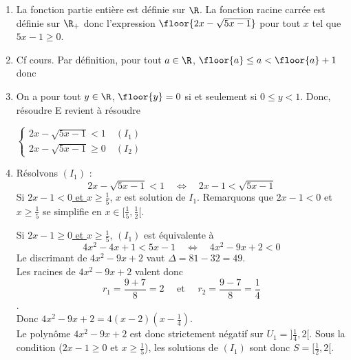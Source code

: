 \begin{correction}
\begin{enumerate}
\item La fonction partie entière est définie sur $\R$. La fonction racine carrée est définie sur $\R_+$ donc 
l'expression $\floor{2x - \sqrt{5x-1}} $ pour tout $x$ tel que $5x-1\geq0$. 
\begin{center}
\end{center} 

\item Cf cours. Par définition, pour tout $a\in \R$, $\floor{a}\leq a <\floor{a}+1$ donc 

\begin{center}
\end{center} 

\item On a pour tout $y\in \R$, $\floor{y}=0$ si et seulement si $0\leq y <1$. Donc, résoudre E revient à résoudre 


\begin{center}

$\boxed{ 
\left\{
\begin{array}{c}
2x-\sqrt{5x-1} <1 \quad (I_1)\\
2x-\sqrt{5x-1} \geq 0  \quad (I_2)
\end{array}\right.
}$

\end{center} 

\item  Résolvons $(I_1)$ : 
\begin{equation*}
2x -\sqrt{5x-1}<1\quad \Longleftrightarrow \quad  2x-1 < \sqrt{5x-1} 
\end{equation*}
Si \underline{$2x-1<0$ et $x\geq \frac{1}{5}$}, $x$ est solution de $I_1$. Remarquons que $2x-1<0$ et $x\geq \frac{1}{5}$ se simplifie en $x\in [\frac{1}{5}, \frac{1}{2}[$.


Si \underline{$2x-1\geq 0$ et $x\geq \frac{1}{5}$}, $(I_1)$ est équivalente à 
$$4x^2-4x+1 < 5x-1 \quad \Longleftrightarrow \quad  4x^2-9x+2< 0 $$ 
Le discrimant de $4x^2-9x+2$ vaut $\Delta= 81 -32= 49$.  \\
Les racines de $4x^2-9x+2$ valent donc 
$$r_1 = \frac{9+7}{8}=2 \quad \text{ et } \quad r_2= \frac{9-7}{8}=\frac{1}{4}$$.\\
Donc $4x^2-9x+2 = 4(x-2)(x-\frac{1}{4})$.\\
Le polynôme $4x^2-9x+2 $ est donc strictement négatif sur $ U_1 =] \frac{1}{4},2[. $
Sous la condition ($2x-1\geq 0$ et $x\geq \frac{1}{5}$), les solutions de $(I_1)$ sont donc 
$S= [\frac{1}{2}, 2[. $


\end{enumerate}
\end{correction}
